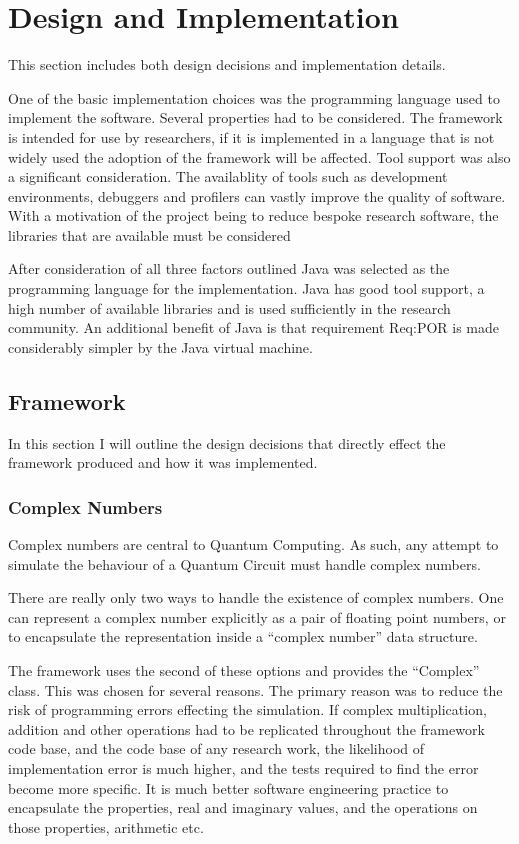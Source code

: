 \chapter{Design and Implementation}
\lstset{language=Java}
This section includes both design decisions and implementation details.

One of the basic implementation choices was the programming language used to implement the software.
Several properties had to be considered.
The framework is intended for use by researchers, if it is implemented in a language that is not widely used the adoption of the framework will be affected.
Tool support was also a significant consideration.
The availablity of tools such as development environments, debuggers and profilers can vastly improve the quality of software.
With a motivation of the project being to reduce bespoke research software, the libraries that are available must be considered

After consideration of all three factors outlined Java was selected as the programming language for the implementation.
Java has good tool support, a high number of available libraries and is used sufficiently in the research community.
An additional benefit of Java is that requirement Req:POR is made considerably simpler by the Java virtual machine.

\section{Framework}
In this section I will outline the design decisions that directly effect the framework produced and how it was implemented.

\subsection{Complex Numbers}
Complex numbers are central to Quantum Computing.
As such, any attempt to simulate the behaviour of a Quantum Circuit must handle complex numbers.

There are really only two ways to handle the existence of complex numbers.
One can represent a complex number explicitly as a pair of floating point numbers, or to encapsulate the representation inside a ``complex number'' data structure.

The framework uses the second of these options and provides the ``Complex'' class.
This was chosen for several reasons.
The primary reason was to reduce the risk of programming errors effecting the simulation.
If complex multiplication, addition and other operations had to be replicated throughout the framework code base, and the code base of any research work, the likelihood of implementation error is much higher, and the tests required to find the error become more specific.
It is much better software engineering practice to encapsulate the properties, real and imaginary values, and the operations on those properties, arithmetic etc.

